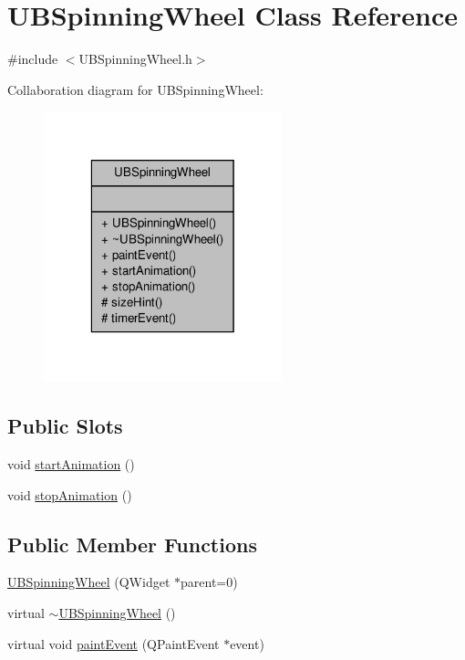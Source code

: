 \hypertarget{class_u_b_spinning_wheel}{\section{U\-B\-Spinning\-Wheel Class Reference}
\label{d6/da4/class_u_b_spinning_wheel}
}


{\ttfamily \#include $<$U\-B\-Spinning\-Wheel.\-h$>$}



Collaboration diagram for U\-B\-Spinning\-Wheel\-:
\nopagebreak
\begin{figure}[H]
\begin{center}
\leavevmode
\includegraphics[width=196pt]{d4/d59/class_u_b_spinning_wheel__coll__graph}
\end{center}
\end{figure}
\subsection*{Public Slots}
\begin{DoxyCompactItemize}
\item 
void \hyperlink{class_u_b_spinning_wheel_acbcc339c4ad8ac331812ef58581e8264}{start\-Animation} ()
\item 
void \hyperlink{class_u_b_spinning_wheel_afce6e8912a9ea4ce878ea2a0dcd47d7e}{stop\-Animation} ()
\end{DoxyCompactItemize}
\subsection*{Public Member Functions}
\begin{DoxyCompactItemize}
\item 
\hyperlink{class_u_b_spinning_wheel_adc36904b01c2c3c9eb2f52979fe00837}{U\-B\-Spinning\-Wheel} (Q\-Widget $\ast$parent=0)
\item 
virtual \hyperlink{class_u_b_spinning_wheel_a30267ecc6e9d37802a4ff3a23d2f5c2c}{$\sim$\-U\-B\-Spinning\-Wheel} ()
\item 
virtual void \hyperlink{class_u_b_spinning_wheel_aa5ae2e13e0995bd49cd266e1e61b8224}{paint\-Event} (Q\-Paint\-Event $\ast$event)
\end{DoxyCompactItemize}
